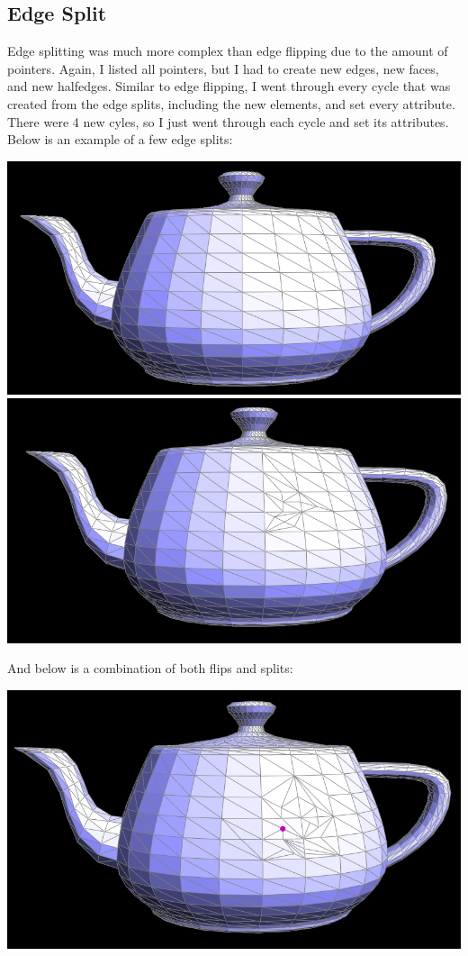 \documentclass{article}
\begin{document}
\subsection{Edge Split}
Edge splitting was much more complex than edge flipping due to the amount of pointers. Again, I listed all pointers, but I had to create new edges, new faces, and new halfedges. Similar to edge flipping, I went through every cycle that was created from the edge splits, including the new elements, and set every attribute. There were 4 new cyles, so I just went through each cycle and set its attributes. Below is an example of a few edge splits:
\begin{center}
    \includegraphics[]{Part 4/before.png}
    \includegraphics[]{Part 5/edgesplits.png}

\end{center}
And below is a combination of both flips and splits:
\begin{center}
    \includegraphics[]{Part 5/flipsysplits.png}
\end{center}
\end{document}
